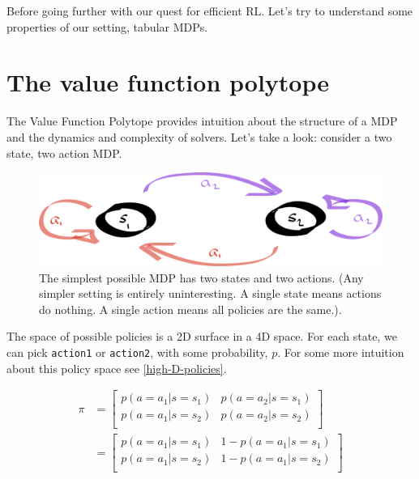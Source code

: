 
\newpage

Before going further with our quest for efficient RL. Let's try to understand
some properties of our setting, tabular MDPs.


\section{The value function polytope}

The Value Function Polytope \cite{Dadashi2018} provides intuition
about the structure of a MDP and the dynamics and complexity of solvers.
Let's take a look: consider a two state, two action MDP.

\begin{figure}[hb!]
\centering
\includegraphics[width=1\textwidth,height=0.25\textheight]{../../pictures/drawings/2-state-automata.png}
\caption{The simplest possible MDP has two states and two actions. (Any simpler setting is entirely uninteresting. A single state means actions do nothing.
A single action means all policies are the same.).}
\end{figure}

The space of possible policies is a 2D surface in a 4D space. For each state, we
can pick \texttt{action1} or \texttt{action2}, with some probability, $p$. For some more intuition
about this policy space see \ref{high-D-policies}.

\begin{align}
\pi &=
\begin{bmatrix}
  p(a=a_1|s=s_1) & p(a=a_2|s=s_1) \\
  p(a=a_1|s=s_2) & p(a=a_2|s=s_2)\\
\end{bmatrix} \\
&=
\begin{bmatrix}
p(a=a_1|s=s_1) & 1-p(a=a_1|s=s_1) \\
p(a=a_1|s=s_2) & 1-p(a=a_1|s=s_2)\\
\end{bmatrix}
\end{align}

